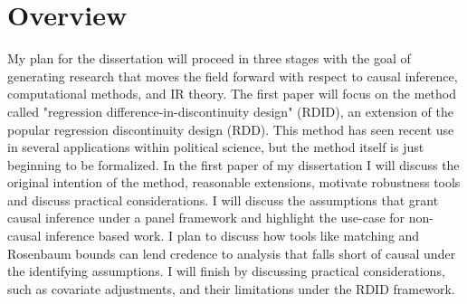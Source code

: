 \documentclass[12pt]{article}
\begin{document}
\section*{Overview}


My plan for the dissertation will proceed in three stages with the goal of generating research that moves the field forward with respect to causal inference, computational methods, and IR theory. The first paper will focus on the method called "regression difference-in-discontinuity design" (RDID), an extension of the popular regression discontinuity design (RDD). This method has seen recent use in several applications within political science, but the method itself is just beginning to be formalized. In the first paper of my dissertation I will discuss the original intention of the method, reasonable extensions, motivate robustness tools and discuss practical considerations. I will discuss the assumptions that grant causal inference under a panel framework and highlight the use-case for non-causal inference based work. I plan to discuss how tools like matching and Rosenbaum bounds can lend credence to analysis that falls short of causal under the identifying assumptions. I will finish by discussing practical considerations, such as covariate adjustments, and their limitations under the RDID framework.
\end{document}
